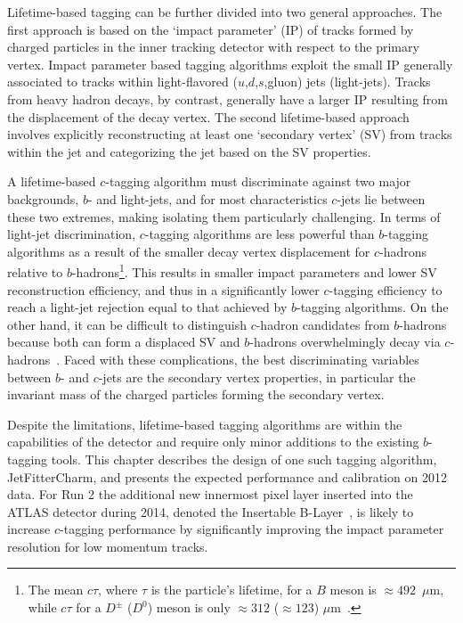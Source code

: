 Lifetime-based tagging can be further divided into two general approaches. The first approach is based on the `impact parameter' (IP) of tracks formed by charged particles in the inner tracking detector with respect to the primary vertex. Impact parameter based tagging algorithms exploit the small IP generally associated to tracks within light-flavored ($u$,$d$,$s$,gluon) jets (light-jets). Tracks from heavy hadron decays, by contrast, generally have a larger IP resulting from the displacement of the decay vertex. The second lifetime-based approach involves explicitly reconstructing at least one `secondary vertex' (SV) from tracks within the jet and categorizing the jet based on the SV properties.

A lifetime-based $c$-tagging algorithm must discriminate against two major backgrounds, $b$- and light-jets, and for most characteristics $c$-jets lie between these two extremes, making isolating
them particularly challenging.
In terms of light-jet discrimination, $c$-tagging algorithms are less powerful than $b$-tagging algorithms as a result of the smaller decay vertex displacement for $c$-hadrons relative to $b$-hadrons\footnote{The mean $c\tau$, where $\tau$ is the particle's lifetime, for a $B$ meson is $\approx 492$~$\mu$m, while $c\tau$ for a $D^{\pm}$ ($D^0$) 
meson is only $\approx 312$ ($\approx 123$) $\mu$m~\cite{pdg2014}.}.
This results in smaller impact parameters and lower SV reconstruction efficiency, and thus in a significantly lower $c$-tagging efficiency to reach a light-jet rejection equal to that achieved by $b$-tagging algorithms.
On the other hand, it can be difficult to distinguish $c$-hadron candidates from $b$-hadrons because both can form a displaced SV
and $b$-hadrons overwhelmingly decay via $c$-hadrons~\cite{pdg2014}. Faced with these complications, the best discriminating variables between $b$- and $c$-jets are the secondary vertex properties, in particular the invariant mass of the charged particles forming the secondary vertex.

Despite the limitations, lifetime-based tagging algorithms are within the capabilities of the detector and require only minor additions to the existing $b$-tagging tools. This chapter describes the design of
one such tagging algorithm, JetFitterCharm, and presents the expected performance and calibration on 2012 data.
For Run 2 the additional new innermost pixel layer inserted into the ATLAS detector during 2014, denoted the Insertable B-Layer~\cite{IBLTDR}, is likely to increase $c$-tagging performance by significantly improving the impact parameter resolution for low momentum tracks.

